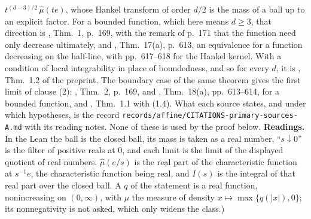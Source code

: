 \begin{proposition}
{$t^{(d-3)/2}\,\widehat\mu(te)$, whose Hankel transform of order $d/2$ is the mass of a ball up
to an explicit factor. For a bounded function, which here means $d \ge 3$, that direction is
, Thm.~1, p.~169, with the remark of p.~171 that the function need only
decrease ultimately, and , Thm.~17(a), p.~613, an equivalence for a
function decreasing on the half-line, with pp.~617--618 for the Hankel kernel. With a condition
of local integrability in place of boundedness, and so for every $d$, it is
, Thm.~1.2 of the preprint. The boundary case of the same theorem gives
the first limit of clause (2): , Thm.~2, p.~169, and
, Thm.~18(a), pp.~613--614, for a bounded function, and
, Thm.~1.1 with (1.4). What each source states, and under which
hypotheses, is the record \texttt{records/affine/CITATIONS-primary-sources-A.md} with its
reading notes. None of these is used by the proof below.
\textbf{Readings.} In the Lean the ball is
the closed ball, its mass is taken as a real number, ``$s \downarrow 0$'' is the filter of
positive reals at $0$, and each limit is the limit of the displayed quotient of real numbers.
$\widehat\mu(e/s)$ is the real part of the characteristic function at $s^{-1}e$, the
characteristic function being real, and $I(s)$ is the integral of that real part over the closed
ball. A $q$ of the statement is a real function, nonincreasing on $(0,\infty)$, with $\mu$ the
measure of density $x \mapsto \max\{q(|x|),0\}$; its nonnegativity is not asked, which only widens
the class.)}
\end{proposition}


